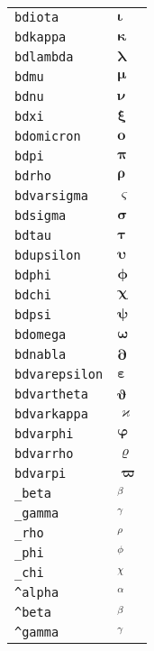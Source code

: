\begin{longtable}{ll}
\texttt{bdiota}&${}\boldsymbol{\iota} {}$\\
\texttt{bdkappa}&${}\boldsymbol{\kappa} {}$\\
\texttt{bdlambda}&${}\boldsymbol{\lambda} {}$\\
\texttt{bdmu}&${}\boldsymbol{\mu} {}$\\
\texttt{bdnu}&${}\boldsymbol{\nu} {}$\\
\texttt{bdxi}&${}\boldsymbol{\xi} {}$\\
\texttt{bdomicron}&${}\boldsymbol{o} {}$\\
\texttt{bdpi}&${}\boldsymbol{\pi} {}$\\
\texttt{bdrho}&${}\boldsymbol{\rho} {}$\\
\texttt{bdvarsigma}&${}\boldsymbol{\varsigma} {}$\\
\texttt{bdsigma}&${}\boldsymbol{\sigma} {}$\\
\texttt{bdtau}&${}\boldsymbol{\tau} {}$\\
\texttt{bdupsilon}&${}\boldsymbol{\upsilon} {}$\\
\texttt{bdphi}&${}\boldsymbol{\phi} {}$\\
\texttt{bdchi}&${}\boldsymbol{\chi} {}$\\
\texttt{bdpsi}&${}\boldsymbol{\psi} {}$\\
\texttt{bdomega}&${}\boldsymbol{\omega} {}$\\
\texttt{bdnabla}&${}\boldsymbol{\partial} {}$\\
\texttt{bdvarepsilon}&${}\boldsymbol{\varepsilon} {}$\\
\texttt{bdvartheta}&${}\boldsymbol{\vartheta} {}$\\
\texttt{bdvarkappa}&${}\boldsymbol{\varkappa} {}$\\
\texttt{bdvarphi}&${}\boldsymbol{\varphi} {}$\\
\texttt{bdvarrho}&${}\boldsymbol{\varrho} {}$\\
\texttt{bdvarpi}&${}\boldsymbol{\varpi} {}$\\
\texttt{\_beta}&${}_\beta {}$\\
\texttt{\_gamma}&${}_\gamma {}$\\
\texttt{\_rho}&${}_\rho {}$\\
\texttt{\_phi}&${}_\phi {}$\\
\texttt{\_chi}&${}_\chi {}$\\
\texttt{\textasciicircum alpha}&${}^\alpha {}$\\
\texttt{\textasciicircum beta}&${}^\beta {}$\\
\texttt{\textasciicircum gamma}&${}^\gamma {}$\\

\end{longtable}
